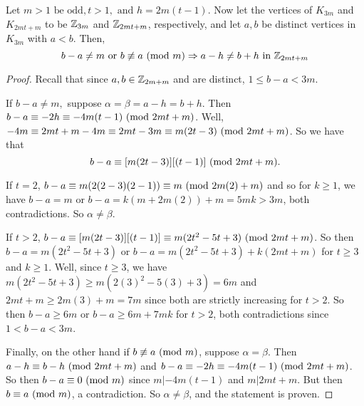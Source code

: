 \begin{thm}
  Let $m>1\text{ be odd},t>1,\text{ and } h = 2m(t-1)$. Now let the vertices of $K_{3m}$ and $K_{2mt+m}$ to be $\mathbb{Z}_{3m}$ and $\mathbb{Z}_{2mt+m}$, respectively, and let $a,b$ be distinct vertices in $K_{3m}$ with $a<b$. Then,
    $$b-a\neq m\text{ or }b\not\equiv a\ (\mathrm{mod}\ m)\Rightarrow a-h \neq b+h\text{ in }\mathbb{Z}_{2mt+m}$$

    \begin{proof}
        Recall that since $a,b\in \mathbb{Z}_{2m+m}$ and are distinct, $1\leq b-a<3m$.\newline 
        
        \noindent If $b-a\neq m,$ suppose $\alpha = \beta = a-h=b+h$. Then $b-a\equiv -2h\equiv -4m(t-1)\ (\mathrm{mod}\ 2mt+m)$. Well,  $-4m \equiv 2mt+m-4m\equiv 2mt-3m\equiv m(2t-3)\ (\mathrm{mod}\ 2mt+m)$. So we have that $$b-a\equiv [m(2t-3)][(t-1)]\ (\mathrm{mod}\ 2mt+m).$$
        
        \noindent If $t=2$, $b-a\equiv m(2(2-3)(2-1))\equiv m\ (\mathrm{mod}\ 2m(2)+m)$ and so for $k\geq 1$, we have $b-a = m$ or $b-a= k(m+2m(2))+m = 5mk>3m$, both contradictions. So $\alpha\neq \beta$.\newline
        
        \noindent If $t>2$, $b-a\equiv [m(2t-3)][(t-1)] \equiv m(2t^{2}-5t+3)\ (\mathrm{mod}\ 2mt+m)$. So then $b-a=m(2t^{2}-5t+3)$ or $b-a=m(2t^{2}-5t+3) + k(2mt+m)$ for $t\geq 3$ and $k\geq 1$. Well, since $t\geq 3$, we have $m(2t^{2}-5t+3)\geq m(2(3)^{2}-5(3)+3)=6m$ and $2mt+m\geq 2m(3)+m=7m$ since both are strictly increasing for $t>2$. So then $b-a\geq 6m$ or $b-a\geq 6m+7mk$ for $t>2$, both contradictions since $1<b-a<3m$.\newline

        \noindent Finally, on the other hand if $b\not\equiv a\ (\mathrm{mod}\ m)$, suppose $\alpha = \beta$. Then $a-h\equiv b-h \ (\mathrm{mod}\ 2mt+m)$ and $b-a\equiv -2h\equiv -4m(t-1)\ (\mathrm{mod}\ 2mt+m)$. So then $b-a\equiv 0\ (\mathrm{mod}\ m)$ since $m|-4m(t-1)$ and $m|2mt+m.$ But then $b\equiv a\ (\mathrm{mod}\ m)$, a contradiction. So $\alpha\neq \beta$, and the statement is proven.
        
    \end{proof}
\end{thm}

